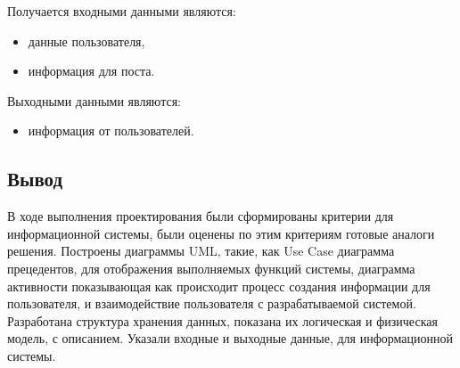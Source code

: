 \pagebreak


Получается входными данными являются:
\begin{itemize}
	\item данные пользователя,
	\item информация для поста.
\end{itemize}

Выходными данными являются:
\begin{itemize}
	\item информация от пользователей.
\end{itemize}  

\subsection{Вывод}
В ходе выполнения проектирования были сформированы критерии для информационной системы, были оценены по этим критериям готовые аналоги решения. Построены диаграммы UML, такие, как Use Case диаграмма прецедентов, для отображения выполняемых функций системы, диаграмма активности показывающая как происходит процесс создания информации для пользователя, и взаимодействие пользователя с разрабатываемой системой. Разработана структура хранения данных, показана их логическая и физическая модель, с описанием. Указали входные и выходные данные, для информационной системы.

\pagebreak